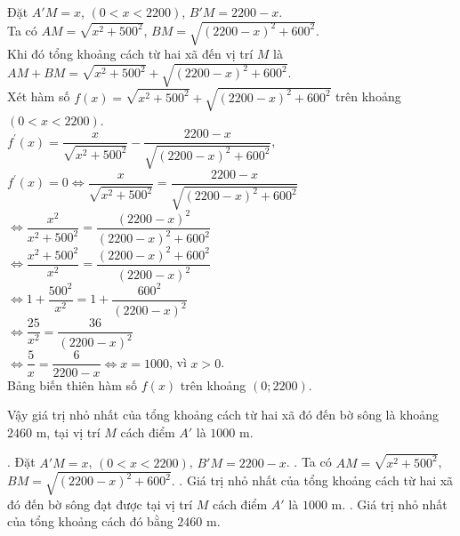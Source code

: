 \begin{ex}
{\begin{center}
        \end{center}
        Đặt $A'M=x$, $(0<x<2200)$, $B'M=2200-x$.\\
        Ta có $AM=\sqrt{x^2+500^2}$, $BM=\sqrt{(2200-x)^2+600^2}$.\\
        Khi đó tổng khoảng cách từ hai xã đến vị trí $M$ là $AM+BM= \sqrt{x^2+500^2}+\sqrt{(2200-x)^2+600^2} $.\\
        Xét hàm số $f(x)= \sqrt{x^2+500^2}+\sqrt{(2200-x)^2+600^2}$ trên khoảng $(0<x<2200)$.\\
        $f^\prime (x)=\dfrac{x}{\sqrt{x^2+500^2}}-\dfrac{2200-x}{\sqrt{(2200-x)^2+600^2}}$, $f^\prime (x)=0\Leftrightarrow \dfrac{x}{\sqrt{x^2+500^2}}=\dfrac{2200-x}{\sqrt{(2200-x)^2+600^2}}$\\
        $\Leftrightarrow \dfrac{x^2}{x^2+500^2}=\dfrac{(2200-x)^2}{(2200-x)^2+600^2}$\\
        $\Leftrightarrow \dfrac{x^2+500^2}{x^2}=\dfrac{(2200-x)^2+600^2}{(2200-x)^2}$\\
        $\Leftrightarrow 1+\dfrac{500^2}{x^2}=1+\dfrac{600^2}{(2200-x)^2}$\\
        $\Leftrightarrow \dfrac{25}{x^2}=\dfrac{36}{(2200-x)^2}$\\
        $\Leftrightarrow \dfrac{5}{x}=\dfrac{6}{2200-x}\Leftrightarrow x=1000$, vì $ x>0$.\\
        Bảng biến thiên hàm số $f(x)$ trên khoảng $\left( 0;2200\right)$.
        \begin{center}
        \end{center}
        Vậy giá trị nhỏ nhất của tổng khoảng cách từ hai xã đó đến bờ sông là khoảng $2460$ m, tại vị trí $M$ cách điểm $A'$ là $1000$ m.
        \begin{itemchoice}
            . Đặt $A'M=x$, $(0<x<2200)$, $B'M=2200-x$.
            . Ta có $AM=\sqrt{x^2+500^2}$, $BM=\sqrt{(2200-x)^2+600^2}$.
            . Giá trị nhỏ nhất của tổng khoảng cách từ hai xã đó đến bờ sông đạt được tại vị trí $M$ cách điểm $A'$ là $1000$ m.
            . Giá trị nhỏ nhất của tổng khoảng cách đó bằng $2460$ m.
        \end{itemchoice}
    }
\end{ex}
